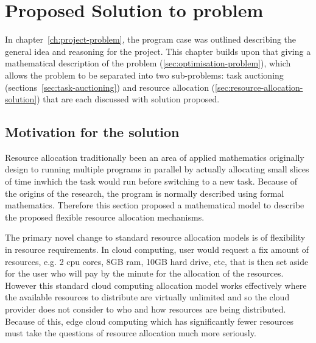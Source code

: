 \chapter{Proposed Solution to problem}\label{ch:proposed-solution-to-problem}
In chapter~\ref{ch:project-problem}, the program case was outlined describing the general idea and reasoning for the
project. This chapter builds upon that giving a mathematical description of the problem (\ref{sec:optimisation-problem}),
which allows the problem to be separated into two sub-problems: task auctioning (sections~\ref{sec:task-auctioning})
and resource allocation (\ref{sec:resource-allocation-solution}) that are each discussed with solution proposed.

\section{Motivation for the solution}
Resource allocation traditionally been an area of applied mathematics originally design to running multiple
programs in parallel by actually allocating small slices of time inwhich the task would run before switching to a new
task. Because of the origins of the research, the program is normally described using formal mathematics. Therefore
this section proposed a mathematical model to describe the proposed flexible resource allocation mechanisms.

The primary novel change to standard resource allocation models is of flexibility in resource requirements. In cloud
computing, user would request a fix amount of resources, e.g. 2 cpu cores, 8GB ram, 10GB hard drive, etc, that is then
set aside for the user who will pay by the minute for the allocation of the resources. However this standard cloud
computing allocation model works effectively where the available resources to distribute are virtually unlimited and so
the cloud provider does not consider to who and how resources are being distributed. Because of this, edge cloud
computing which has significantly fewer resources must take the questions of resource allocation much more seriously.

